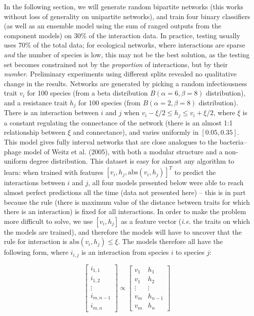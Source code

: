\documentclass[11pt]{article}
\begin{document}
In the following section, we will generate random bipartite networks
(this works without loss of generality on unipartite networks), and
train four binary classifiers (as well as an ensemble model using the
sum of ranged outputs from the component models) on 30\% of the
interaction data. In practice, testing usually uses 70\% of the total
data; for ecological networks, where interactions are sparse \emph{and}
the number of species is low, this may not be the best solution, as the
testing set becomes constrained not by the \emph{proportion} of
interactions, but by their \emph{number}. Preliminary experiments using
different splits revealed no qualitative change in the results. Networks
are generated by picking a random infectiousness trait \(v_i\) for 100
species (from a beta distribution \(B(\alpha=6,\beta=8)\) distribution),
and a resistance trait \(h_j\) for 100 species (from
\(B(\alpha=2,\beta=8)\) distribution). There is an interaction between
\(i\) and \(j\) when \(v_i-\xi/2 \le h_j \le v_i+\xi/2\), where \(\xi\)
is a constant regulating the connectance of the network (there is an
almost 1:1 relationship between \(\xi\) and connectance), and varies
uniformly in \([0.05, 0.35]\). This model gives fully interval networks
that are close analogues to the bacteria--phage model of Weitz et al.
(2005), with both a modular structure and a non-uniform degree
distribution. This dataset is easy for almost any algorithm to learn:
when trained with features \([v_i, h_j, \text{abs}(v_i, h_j)] ^T\) to
predict the interactions between \(i\) and \(j\), all four models
presented below were able to reach almost perfect predictions all the
time (data not presented here) -- this is in part because the rule
(there is maximum value of the distance between traits for which there
is an interaction) is fixed for all interactions. In order to make the
problem more difficult to solve, we use \([v_i, h_j]\) as a feature
vector (\emph{i.e.} the traits on which the models are trained), and
therefore the models will have to uncover that the rule for interaction
is \(\text{abs}(v_i, h_j) \le \xi\). The models therefore all have the
following form, where \(i_{i,j}\) is an interaction from species \(i\)
to species \(j\):

\[
\begin{bmatrix}
    i_{1,1} \\
    i_{1,2} \\
    \vdots \\
    i_{m,n-1} \\
    i_{m,n}
\end{bmatrix}
\propto
\begin{bmatrix}
           v_{1} & h_{1} \\
           v_{1} & h_{2} \\
           \vdots & \vdots \\
           v_{m} & h_{n-1} \\
           v_{m} & h_{n}
         \end{bmatrix}
\]
\end{document}
